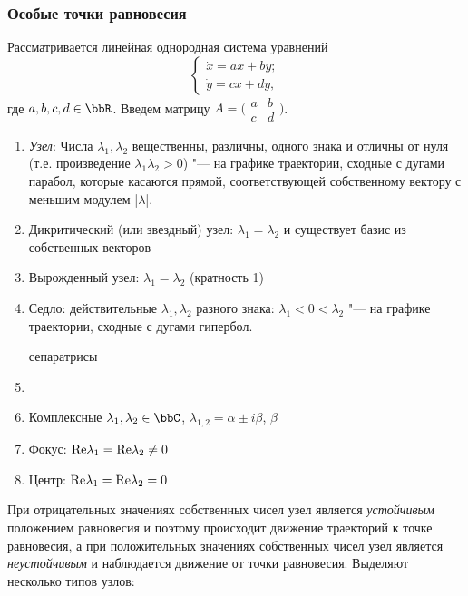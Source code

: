 \subsubsection {Особые точки равновесия}
Рассматривается линейная однородная система уравнений
\begin{equation}\label{formulasDE}
\begin{cases}
\dot x = a x + b y;\\
\dot y = c x + d y,
\end{cases}
\end{equation}
где $a,b,c,d\in\bbR$. Введем матрицу $A=\big(\begin{smallmatrix}
	a & b\\
	c & d
\end{smallmatrix}\big)$.
\begin{enumerate}[wide]
\item
\textit{Узел}: Числа $\lambda _1, \lambda _2$ вещественны, различны, одного знака и отличны от нуля (т.е. произведение $\lambda_1\lambda_2>0$) "--- на графике траектории, сходные с дугами парабол, которые касаются прямой, соответствующей собственному вектору с меньшим модулем |$\lambda$|. 

\item Дикритический (или звездный) узел: $\lambda _1 = \lambda _2$ и существует базис из собственных векторов  

\item Вырожденный узел: $\lambda _1 = \lambda _2$ (кратность 1)


\item
Седло: действительные $\lambda _1, \lambda _2$ разного знака: $\lambda_1<0<\lambda_2$ "--- на графике траектории, сходные с дугами гипербол.

сепаратрисы 

\item 
\item Комплексные $\lambda_1,\lambda_2\in\bbC$, $\lambda_{1,2} = \alpha\pm i\beta$, $\beta$

\item
Фокус: $\rm{Re}\lambda _1 = \rm{Re}\lambda _2 \ne 0$ 

\item
Центр: $\rm{Re}\lambda _1 = \rm{Re}\lambda _2 = 0$ 
\end{enumerate}

При отрицательных значениях собственных чисел узел является \textit{устойчивым} положением равновесия и поэтому происходит движение траекторий к точке равновесия, а при положительных значениях собственных чисел узел является \textit{неустойчивым} и наблюдается движение от точки равновесия. Выделяют несколько типов узлов:

